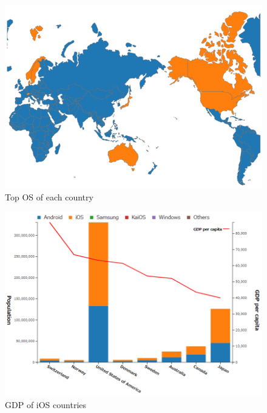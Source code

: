 \documentclass[12pt, a4paper]{jarticle}
\begin{document}
\begin{figure}[H]
  \centering
  \includegraphics[keepaspectratio, scale=0.8]{imgs/map_os.png}
  \caption{Top OS of each country}
  \label{fig:map_os}
\end{figure}

\begin{figure}[H]
  \centering
  \includegraphics[keepaspectratio, scale=0.6]{imgs/bar_ios.png}
  \caption{GDP of iOS countries}
  \label{fig:bar_ios}
\end{figure}
\end{document}

